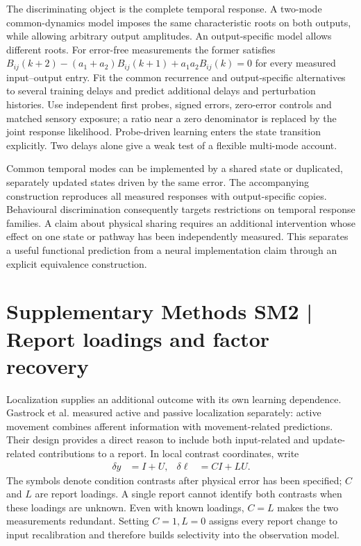\documentclass[11pt,a4paper]{article}
\begin{document}
The discriminating object is the complete temporal response. A two-mode common-dynamics model imposes the same characteristic roots on both outputs, while allowing arbitrary output amplitudes. An output-specific model allows different roots. For error-free measurements the former satisfies $B_{ij}(k+2)-(a_1+a_2)B_{ij}(k+1)+a_1a_2B_{ij}(k)=0$ for every measured input--output entry. Fit the common recurrence and output-specific alternatives to several training delays and predict additional delays and perturbation histories. Use independent first probes, signed errors, zero-error controls and matched sensory exposure; a ratio near a zero denominator is replaced by the joint response likelihood. Probe-driven learning enters the state transition explicitly. Two delays alone give a weak test of a flexible multi-mode account. \cite{unlearning2016}

Common temporal modes can be implemented by a shared state or duplicated, separately updated states driven by the same error. The accompanying construction reproduces all measured responses with output-specific copies. Behavioural discrimination consequently targets restrictions on temporal response families. A claim about physical sharing requires an additional intervention whose effect on one state or pathway has been independently measured. This separates a useful functional prediction from a neural implementation claim through an explicit equivalence construction.

\clearpage\section{Supplementary Methods SM2 | Report loadings and factor recovery}

Localization supplies an additional outcome with its own learning dependence. Gastrock et al. measured active and passive localization separately: active movement combines afferent information with movement-related predictions. Their design provides a direct reason to include both input-related and update-related contributions to a report. In local contrast coordinates, write
\begin{align}\delta y&=I+U, &\delta\ell&=C I+L U.\label{eq:calibration}\end{align}
The symbols denote condition contrasts after physical error has been specified; $C$ and $L$ are report loadings. A single report cannot identify both contrasts when these loadings are unknown. Even with known loadings, $C=L$ makes the two measurements redundant. Setting $C=1,L=0$ assigns every report change to input recalibration and therefore builds selectivity into the observation model. \cite{external2020,hayashi2020}
\end{document}

